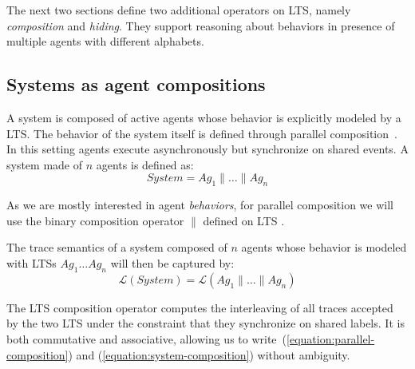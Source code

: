 The next two sections define two additional operators on LTS, namely \emph{composition} and \emph{hiding}. They support reasoning about behaviors in presence of multiple agents with different alphabets.

\subsection{Systems as agent compositions\label{subsection:lts-composition}}

A system is composed of active agents whose behavior is explicitly modeled by a LTS. The behavior of the system itself is defined through parallel composition~\cite{Hoare:1985}. In this setting agents execute asynchronously but synchronize on shared events. A system made of $n$ agents is defined as:
\begin{equation}
System = Ag_1 \parallel \ldots \parallel Ag_n
\label{equation:parallel-composition}
\end{equation}

As we are mostly interested in agent \emph{behaviors}, for parallel composition we will use the binary composition operator $\parallel$ defined on LTS \cite{Giannakopoulou:1999, Magee:1999}. 

The trace semantics of a system composed of $n$ agents whose behavior is modeled with LTSs $Ag_1 \ldots Ag_n$ will then be captured by:
\begin{equation}
\mathcal{L}(System) = \mathcal{L}(Ag_1 \parallel \ldots \parallel Ag_n)
\label{equation:system-composition}
\end{equation}

The LTS composition operator computes the interleaving of all traces accepted by the two LTS under the constraint that they synchronize on shared labels. It is both commutative and associative, allowing us to write~(\ref{equation:parallel-composition}) and (\ref{equation:system-composition}) without ambiguity. 

